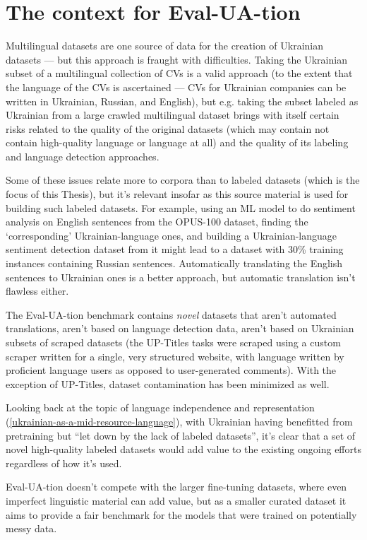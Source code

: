 

\section{The context for Eval-UA-tion}
\label{sec:related-why-eval-ua-tion}
Multilingual datasets are one source of data for the creation of Ukrainian datasets — but this approach is fraught with difficulties. Taking the Ukrainian subset of a multilingual collection of CVs is a valid approach (to the extent that the language of the CVs is ascertained — CVs for Ukrainian companies can be written in Ukrainian, Russian, and English), but e.g. taking the subset labeled as Ukrainian from a large crawled multilingual dataset brings with itself certain risks related to the quality of the original datasets (which may contain not contain high-quality language or language at all) and the quality of its labeling and language detection approaches. 

Some of these issues relate more to corpora than to labeled datasets (which is the focus of this Thesis), but it's relevant insofar as this source material is used for building such labeled datasets.
For example, using an ML model to do sentiment analysis on English sentences from the OPUS-100 dataset, finding the `corresponding' Ukrainian-language ones, and building a Ukrainian-language sentiment detection dataset from it might lead to a dataset with 30\% training instances containing Russian sentences.
Automatically translating the English sentences to Ukrainian ones is a better approach, but automatic translation isn't flawless either.

The Eval-UA-tion benchmark contains \textit{novel} datasets that aren't automated translations, aren't based on language detection data, aren't based on Ukrainian subsets of scraped datasets (the UP-Titles tasks were scraped using a custom scraper written for a single, very structured website, with language written by proficient language users as opposed to user-generated comments). 
With the exception of UP-Titles, dataset contamination has been minimized as well.

Looking back at the topic of language independence and representation 
(\autoref{ukrainian-as-a-mid-resource-language}), with Ukrainian having benefitted from pretraining but \enquote{let down by the lack of labeled datasets}, it's clear that a set of novel high-quality labeled datasets would add value to the existing ongoing efforts regardless of how it's used.

Eval-UA-tion doesn't compete with the larger fine-tuning datasets, where even imperfect linguistic material can add value, but as a smaller curated dataset it aims to provide a fair benchmark for the models that were trained on potentially messy data.



